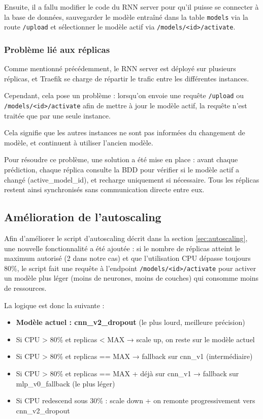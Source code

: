 \documentclass{rapportClass} %
\begin{document}
\smallskip
Ensuite, il a fallu modifier le code du RNN server pour qu'il puisse se connecter à la base de données,
sauvegarder le modèle entraîné dans la table \texttt{models} via la route \texttt{/upload} et sélectionner le modèle
actif via \texttt{/models/<id>/activate}.

\subsubsection{Problème lié aux réplicas}
Comme mentionné précédemment, le RNN server est déployé sur plusieurs réplicas, et Traefik se charge de répartir le 
trafic entre les différentes instances. 

\smallskip
Cependant, cela pose un problème : lorsqu'on envoie une requête \texttt{/upload} 
ou \texttt{/models/<id>/activate} afin de mettre à jour le modèle actif, la requête n'est traitée que par une seule
instance. 

\smallskip
Cela signifie que les autres instances ne sont pas informées du changement de modèle, 
et continuent à utiliser l'ancien modèle.

Pour résoudre ce problème, une solution a été mise en place : avant chaque prédiction, chaque réplica consulte la BDD 
pour vérifier si le modèle actif a changé (active\_model\_id), et recharge uniquement si nécessaire. 
Tous les réplicas restent ainsi synchronisés sans communication directe entre eux.

\subsection{Amélioration de l'autoscaling}
Afin d'améliorer le script d'autoscaling décrit dans la section \ref{sec:autoscaling}, une nouvelle fonctionnalité a été ajoutée : 
si le nombre de réplicas atteint le maximum autorisé (2 dans notre cas) et que l'utilisation CPU dépasse toujours 80\%,
le script fait une requête à l'endpoint \texttt{/models/<id>/activate} pour activer un modèle plus léger 
(moins de neurones, moins de couches) qui consomme moins de ressources.

La logique est donc la suivante :
\begin{itemize}
    \item \textbf{Modèle actuel : cnn\_v2\_dropout} (le plus lourd, meilleure précision)
    \item Si CPU > 80\% et replicas < MAX → scale up, on reste sur le modèle actuel
    \item Si CPU > 80\% et replicas == MAX → fallback sur cnn\_v1 (intermédiaire)
    \item Si CPU > 80\% et replicas == MAX + déjà sur cnn\_v1 → fallback sur mlp\_v0\_fallback (le plus léger)
    \item Si CPU redescend sous 30\% : scale down + on remonte progressivement vers cnn\_v2\_dropout
\end{itemize}
\end{document}
